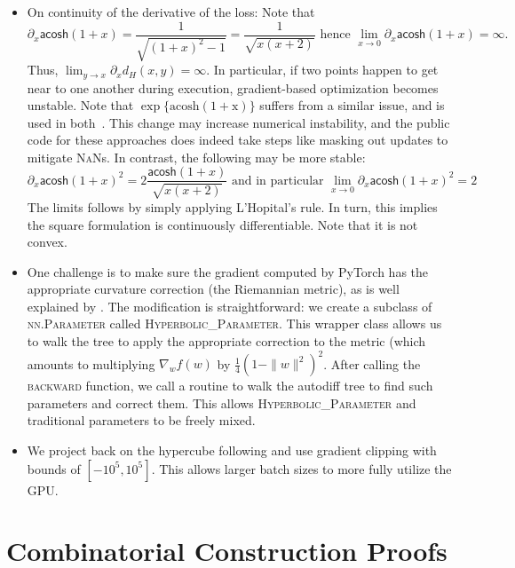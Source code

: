 \begin{itemize}
\item On continuity of the derivative of the loss: Note that
  \[ \partial_{x} \mathsf{acosh}(1+x) = \frac{1}{\sqrt{(1+x)^2 -1 }}
= \frac{1}{\sqrt{x(x+2)}} \text{ hence } \lim_{x \to 0} \partial_{x}
\mathsf{acosh}(1+x) = \infty. \] Thus, $\lim_{y \to x} \partial_{x}
d_{H}(x,y) = \infty$. In particular, if two points happen to get near
to one another during execution, gradient-based optimization becomes
unstable. Note that $\exp\{\mathrm{acosh(1+x)}\}$ suffers from a
similar issue, and is used in both~\cite{fb, ucl}. This change may
increase numerical instability, and the public code for these
approaches does indeed take steps like masking out updates to mitigate
\textsc{NaN}s. In contrast, the following may be more stable:
\[ \partial_{x} \mathsf{acosh}(1+x)^2 = 2 \frac{\mathsf{acosh}(1+x)}{\sqrt{x(x+2)}} \text{ and in particular } \lim_{x \to 0} \partial_{x} \mathsf{acosh}(1+x)^2 = 2\]
The limits follows by simply applying L'Hopital's rule. In turn, this
implies the square formulation is continuously differentiable. Note
that it is not convex.
  \item One challenge is to make sure the gradient computed by PyTorch
    has the appropriate curvature correction (the Riemannian metric),
    as is well explained by \citet{fb}. The modification is
    straightforward: we create a subclass of \textsc{nn.Parameter}
    called \textsc{Hyperbolic\_Parameter}. This wrapper class allows
    us to walk the tree to apply the appropriate correction to the
    metric (which amounts to multiplying $\nabla_{w} f(w)$ by
    $\frac{1}{4}(1-\|w\|^2)^2$. After calling the \textsc{backward}
    function, we call a routine to walk the autodiff tree to find such
    parameters and correct them. This allows
    \textsc{Hyperbolic\_Parameter} and traditional parameters to be
    freely mixed.

    \item We project back on the hypercube following \citet{fb} and
      use gradient clipping with bounds of $[-10^{5},10^5]$. This
      allows larger batch sizes to more fully utilize the GPU.
\end{itemize}

\section{Combinatorial Construction Proofs}
\label{app:CombinatorialProofs}



